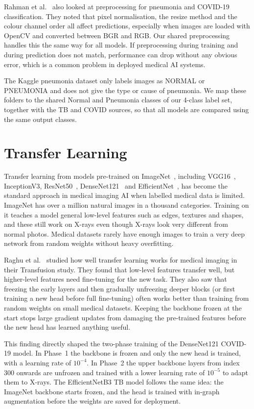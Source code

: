 Rahman et al.~\cite{rahman2021} also looked at preprocessing for pneumonia and COVID-19 classification. They noted that pixel normalisation, the resize method and the colour channel order all affect predictions, especially when images are loaded with OpenCV and converted between BGR and RGB. Our shared preprocessing handles this the same way for all models. If preprocessing during training and during prediction does not match, performance can drop without any obvious error, which is a common problem in deployed medical AI systems.

The Kaggle pneumonia dataset only labels images as NORMAL or PNEUMONIA and does not give the type or cause of pneumonia. We map these folders to the shared Normal and Pneumonia classes of our 4-class label set, together with the TB and COVID sources, so that all models are compared using the same output classes.

\section{Transfer Learning}

Transfer learning from models pre-trained on ImageNet~\cite{deng2009}, including VGG16~\cite{simonyan2014}, InceptionV3, ResNet50~\cite{he2016}, DenseNet121~\cite{huang2017} and EfficientNet~\cite{tan2019}, has become the standard approach in medical imaging AI when labelled medical data is limited. ImageNet has over a million natural images in a thousand categories. Training on it teaches a model general low-level features such as edges, textures and shapes, and these still work on X-rays even though X-rays look very different from normal photos. Medical datasets rarely have enough images to train a very deep network from random weights without heavy overfitting.

Raghu et al.~\cite{raghu2019} studied how well transfer learning works for medical imaging in their Transfusion study. They found that low-level features transfer well, but higher-level features need fine-tuning for the new task. They also saw that freezing the early layers and then gradually unfreezing deeper blocks (or first training a new head before full fine-tuning) often works better than training from random weights on small medical datasets. Keeping the backbone frozen at the start stops large gradient updates from damaging the pre-trained features before the new head has learned anything useful.

This finding directly shaped the two-phase training of the DenseNet121 COVID-19 model. In Phase~1 the backbone is frozen and only the new head is trained, with a learning rate of $10^{-4}$. In Phase~2 the upper backbone layers from index 300 onwards are unfrozen and trained with a lower learning rate of $10^{-5}$ to adapt them to X-rays. The EfficientNetB3 TB model follows the same idea: the ImageNet backbone starts frozen, and the head is trained with in-graph augmentation before the weights are saved for deployment.

